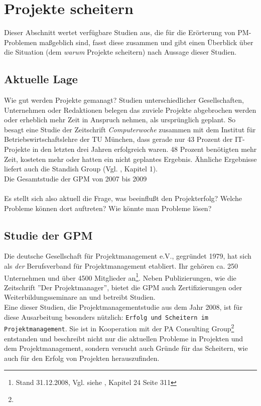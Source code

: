 \documentclass[11pt]{scrartcl}
\begin{document}
\pagebreak
\section{Projekte scheitern}
\label{projekte_scheitern}
Dieser Abschnitt wertet verfügbare Studien aus, die für die Erörterung von PM-Problemen maßgeblich sind, fasst diese zusammen und gibt einen Überblick über die Situation (dem \textit{warum} Projekte scheitern) nach Aussage dieser Studien. 

\subsection{Aktuelle Lage}

Wie gut werden Projekte gemanagt? Studien unterschiedlicher Gesellschaften, Unternehmen oder Redaktionen belegen das zuviele Projekte abgebrochen werden oder erheblich mehr Zeit in Anspruch nehmen, als ursprünglich geplant. So besagt eine Studie der Zeitschrift \textit{Computerwoche} zusammen mit dem Institut für Betriebswirtschaftslehre der TU München, dass gerade nur 43 Prozent der IT-Projekte in den letzten drei Jahren erfolgreich waren. 48 Prozent benötigten mehr Zeit, kosteten mehr oder hatten ein nicht geplantes Ergebnis. Ähnliche Ergebnisse liefert auch die Standish Group (Vgl. \cite{profPM}, Kapitel 1). \\
Die Gesamtstudie der GPM von 2007 bis 2009 \\
\\
Es stellt sich also aktuell die Frage, was beeinflußt den Projekterfolg? Welche Probleme können dort auftreten? Wie könnte man Probleme lösen?

\subsection{Studie der GPM}
\label{studies_gpm}

Die deutsche Gesellschaft für Projektmanagement e.V., gegründet 1979, hat sich als \textit{der} Berufsverband für Projektmanagement etabliert. Ihr gehören ca. 250 Unternehmen und  über 4500 Mitglieder an\footnote{Stand 31.12.2008, Vgl. siehe \cite{proj_zum_erfolg_fuehren}, Kapitel 24 Seite 311}. Neben Publizierungen, wie die Zeitschrift ''Der Projektmanager'', bietet die GPM auch Zertifizierungen oder Weiterbildungsseminare an und betreibt Studien. \\
Eine dieser Studien, die Projektmanagementstudie aus dem Jahr 2008, ist für diese Ausarbeitung besonders nützlich: \texttt{Erfolg und Scheitern im Projektmanagement}. Sie ist in Kooperation mit der PA Consulting Group\footnote{} entstanden und beschreibt nicht nur die aktuellen Probleme in Projekten und dem Projektmanagement, sondern versucht auch Gründe für das Scheitern, wie auch für den Erfolg von Projekten herauszufinden. 
\end{document}
